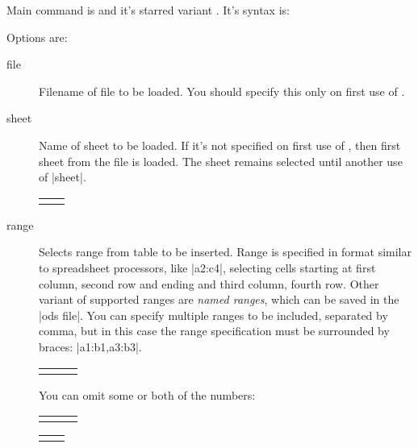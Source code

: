\documentclass{ltxdoc}
\begin{document}
\noindent Main command is 
and it's starred variant . It's syntax is:\\

Options are:

\begin{description}
\item[file] Filename of file to be loaded. You should specify this only on first use of .
\item[sheet] Name of sheet to be loaded. If it's not specified on first use of
  , then first sheet from the file is loaded. The sheet
  remains selected until another use of |sheet|.

\begin{LTXexample}
\begin{tabular}{l l}
\end{tabular}     
\end{LTXexample}

\item[range] Selects range from table to be inserted. Range is specified in
  format similar to spreadsheet processors, like |a2:c4|, selecting cells
  starting at first column, second row and ending and third column, fourth row.
  Other variant of supported ranges are \textit{named ranges}, which can be
  saved in the |ods file|. You can specify multiple ranges to be included, separated
  by comma, but in this case the range specification must be surrounded by braces: |{a1:b1,a3:b3}|.

\begin{LTXexample}
\begin{tabular}{lll}
\end{tabular}     
\end{LTXexample}
You can omit some or both of the numbers:
\begin{LTXexample}
\begin{tabular}{lll}
\end{tabular}     
\end{LTXexample}

\begin{LTXexample}
\begin{tabular}{ll}
\end{tabular}     
\end{LTXexample}
  

\end{description}
\end{document}
